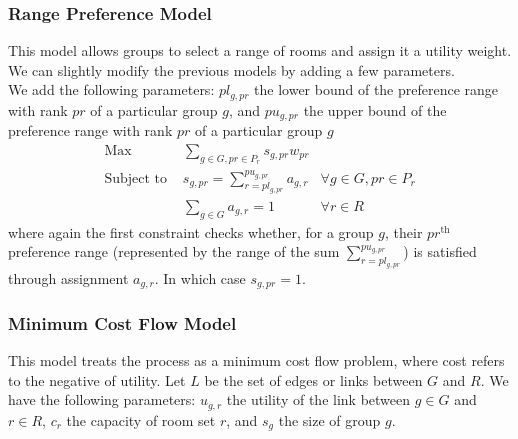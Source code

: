 \documentclass[12pt]{article}
\begin{document}
    \subsubsection*{Range Preference Model}
    This model allows groups to select a range of rooms and assign it a utility weight. We can slightly modify the previous models by adding a few parameters. \\
We add the following parameters: $pl_{g,pr}$ the lower bound of the preference range with rank $pr$ of a particular group $g$, and $pu_{g,pr}$ the upper bound of the preference range with rank $pr$ of a particular group $g$\\
    
    \begin{align*}
    \text{Max} &\sum_{g \in G, pr \in P_r} s_{g,pr}w_{pr}  & \\
    \text{Subject to } &s_{g,pr} = \sum_{r = pl_{g,pr}}^{pu_{g,pr}} a_{g,r} &\forall g \in G, pr \in P_r\\ 
    &\sum_{g \in G} a_{g,r} = 1 &\forall r \in R
    \end{align*}
    where again the first constraint checks whether, for a group $g$, their $pr^{\text{th}}$ preference range (represented by the range of the sum $\sum_{r = pl_{g,pr}}^{pu_{g,pr}}$) is satisfied through assignment $a_{g,r}$. In which case $s_{g,pr} = 1$. \\

    

    
    \subsubsection*{Minimum Cost Flow Model}
    This model treats the process as a minimum cost flow problem, where cost refers to the negative of utility.
    Let $L$ be the set of edges or links between $G$ and $R$.
    We have the following parameters: $u_{g,r}$ the utility of the link between $g \in G$ and $r \in R$, $c_r$ the capacity of room set $r$, and $s_g$ the size of group $g$. 
    
\end{document}
